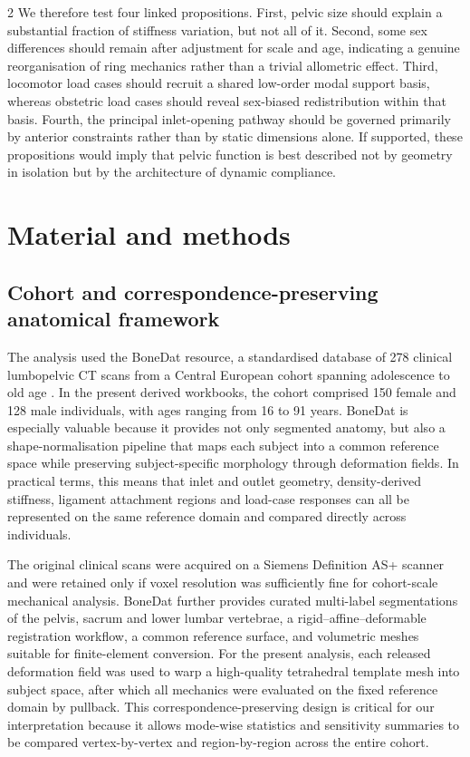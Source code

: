 \documentclass[openacc]{rsproca_new}
\begin{document}
\begin{multicols}{2}
We therefore test four linked propositions. First, pelvic size should explain a substantial fraction of stiffness variation, but not all of it. Second, some sex differences should remain after adjustment for scale and age, indicating a genuine reorganisation of ring mechanics rather than a trivial allometric effect. Third, locomotor load cases should recruit a shared low-order modal support basis, whereas obstetric load cases should reveal sex-biased redistribution within that basis. Fourth, the principal inlet-opening pathway should be governed primarily by anterior constraints rather than by static dimensions alone. If supported, these propositions would imply that pelvic function is best described not by geometry in isolation but by the architecture of dynamic compliance.

\section{Material and methods}

\subsection{Cohort and correspondence-preserving anatomical framework}

The analysis used the BoneDat resource, a standardised database of 278 clinical lumbopelvic CT scans from a Central European cohort spanning adolescence to old age \cite{HenysKuchar2025}. In the present derived workbooks, the cohort comprised 150 female and 128 male individuals, with ages ranging from 16 to 91 years. BoneDat is especially valuable because it provides not only segmented anatomy, but also a shape-normalisation pipeline that maps each subject into a common reference space while preserving subject-specific morphology through deformation fields. In practical terms, this means that inlet and outlet geometry, density-derived stiffness, ligament attachment regions and load-case responses can all be represented on the same reference domain and compared directly across individuals.

The original clinical scans were acquired on a Siemens Definition AS+ scanner and were retained only if voxel resolution was sufficiently fine for cohort-scale mechanical analysis. BoneDat further provides curated multi-label segmentations of the pelvis, sacrum and lower lumbar vertebrae, a rigid--affine--deformable registration workflow, a common reference surface, and volumetric meshes suitable for finite-element conversion. For the present analysis, each released deformation field was used to warp a high-quality tetrahedral template mesh into subject space, after which all mechanics were evaluated on the fixed reference domain by pullback. This correspondence-preserving design is critical for our interpretation because it allows mode-wise statistics and sensitivity summaries to be compared vertex-by-vertex and region-by-region across the entire cohort.


\end{multicols}
\end{document}
